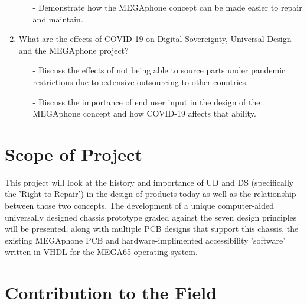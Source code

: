 \begin{enumerate}
\begin{enumerate}
        \item[-] Demonstrate how the MEGAphone concept can be made easier to repair and maintain.
        \end{enumerate} 
    \item What are the effects of COVID-19 on Digital Sovereignty, Universal Design and the MEGAphone project? %
        \begin{enumerate}
        \item[-] Discuss the effects of not being able to source parts under pandemic restrictions due to extensive outsourcing to other countries.
        \item[-] Discuss the importance of end user input in the design of the MEGAphone concept and how COVID-19 affects that ability.
        \end{enumerate} 
\end{enumerate}

\section{Scope of Project}

This project will look at the history and importance of UD and DS (specifically the 'Right to Repair') in the design of products today as well as the relationship between those two concepts.
The development of a unique computer-aided universally designed chassis prototype graded against the seven design principles \cite{sevenprinciples} will be presented, along with multiple PCB designs that support this chassis, the existing MEGAphone PCB and hardware-implimented accessibility 'software' written in VHDL for the MEGA65 operating system.

\section{Contribution to the Field} %

